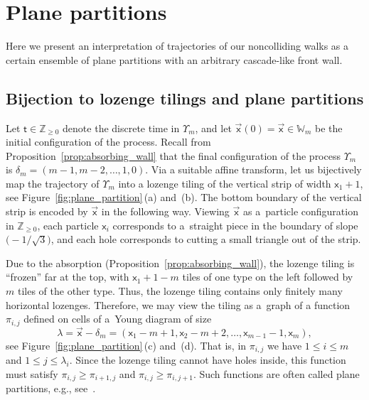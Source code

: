 \documentclass[pdftex]{sigma}
\numberwithin{equation}{section}
\begin{document}
\section{Plane partitions}
\label{sec:plane_partitions}

Here we present an interpretation of trajectories of
our noncolliding walks as a certain ensemble of plane partitions
with an arbitrary cascade-like front wall.

\subsection{Bijection to lozenge tilings and plane partitions}

Let $\mathsf{t}\in \mathbb{Z}_{\ge0}$ denote the discrete time
in $\Upsilon_m$, and
let
$\vec{\mathsf{x}}(0)=\vec{\mathsf{x}}
\in \mathbb{W}_m$
be the initial configuration of the process.
Recall from Proposition~\ref{prop:absorbing_wall}
that the final configuration of the process $\Upsilon_m$
is $\delta_m=(m-1,m-2,\dots,1,0 )$.
Via a suitable
affine transform,
let us bijectively map
the trajectory of $\Upsilon_m$
into a lozenge tiling of the vertical strip
of width $\mathsf{x}_1+1$,
see
Figure~\ref{fig:plane_partition}\,(a) and~(b).
The bottom boundary of the vertical strip is encoded by
$\vec{\mathsf{x}}$ in the following way.
Viewing
$\vec{\mathsf{x}}$ as a~particle configuration in
$\mathbb{Z}_{\ge0}$,
each particle $\mathsf{x}_i$
corresponds to a~straight piece in the boundary of slope
$\big({-}1/\sqrt3\big)$,
and each hole
corresponds to cutting a small triangle
out of the strip.

Due to the absorption (Proposition~\ref{prop:absorbing_wall}),
the lozenge tiling is ``frozen'' far at the top,
with $\mathsf{x}_1+1-m$ tiles of one type on the left followed
by~$m$ tiles of the other type.
Thus, the lozenge tiling contains only finitely many
horizontal lozenges. Therefore, we may view the tiling
as a~graph of a function~$\pi_{i,j}$
defined on cells of a~Young diagram
of size
\begin{equation*}
	\lambda=\vec{\mathsf{x}}-\delta_m=
	(\mathsf{x}_1-m+1,\mathsf{x}_2-m+2,
	\dots,
	\mathsf{x}_{m-1}-1,\mathsf{x}_m ),
\end{equation*}
see Figure~\ref{fig:plane_partition}\,(c) and~(d).
That is, in $\pi_{i,j}$ we have $1\le i\le m$ and
$1\le j\le \lambda_i$.
Since the lozenge tiling cannot have holes inside, this function
must satisfy $\pi_{i,j}\ge\pi_{i+1,j}$ and
$\pi_{i,j}\ge \pi_{i,j+1}$.
Such functions are often called plane partitions, e.g., see~\cite[Chapter~7]{Stanley1999}.
\end{document}
